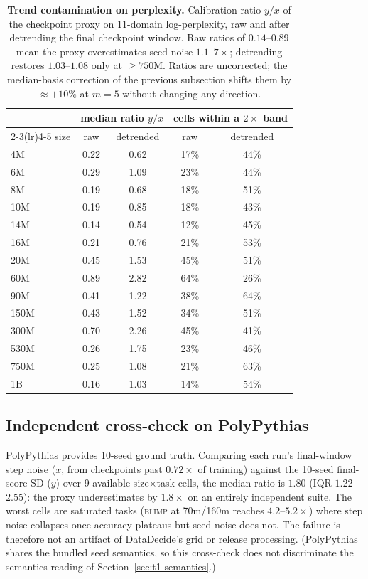 \begin{table}[!htbp]
\centering
\caption{\textbf{Trend contamination on perplexity.} Calibration ratio $y/x$ of the checkpoint
proxy on 11-domain log-perplexity, raw and after detrending the final checkpoint window. Raw
ratios of $0.14$--$0.89$ mean the proxy overestimates seed noise $1.1$--$7\times$; detrending
restores $1.03$--$1.08$ only at ${\ge}750$M. Ratios are uncorrected; the median-basis
correction of the previous subsection shifts them by ${\approx}+10\%$ at $m = 5$ without
changing any direction.}
\label{tab:t1c}
\footnotesize
\begin{tabular}{@{}lcccc@{}}
\toprule
& \multicolumn{2}{c}{median ratio $y/x$} & \multicolumn{2}{c}{cells within a $2\times$ band} \\
\cmidrule(lr){2-3}\cmidrule(lr){4-5}
size & raw & detrended & raw & detrended \\
\midrule
4M & 0.22 & 0.62 & 17\% & 44\% \\
6M & 0.29 & 1.09 & 23\% & 44\% \\
8M & 0.19 & 0.68 & 18\% & 51\% \\
10M & 0.19 & 0.85 & 18\% & 43\% \\
14M & 0.14 & 0.54 & 12\% & 45\% \\
16M & 0.21 & 0.76 & 21\% & 53\% \\
20M & 0.45 & 1.53 & 45\% & 51\% \\
60M & 0.89 & 2.82 & 64\% & 26\% \\
90M & 0.41 & 1.22 & 38\% & 64\% \\
150M & 0.43 & 1.52 & 34\% & 51\% \\
300M & 0.70 & 2.26 & 45\% & 41\% \\
530M & 0.26 & 1.75 & 23\% & 46\% \\
750M & 0.25 & 1.08 & 21\% & 63\% \\
1B & 0.16 & 1.03 & 14\% & 54\% \\
\bottomrule
\end{tabular}
\end{table}

\subsection{Independent cross-check on PolyPythias}
\label{app:t1-pp}

PolyPythias provides 10-seed ground truth. Comparing each run's final-window step noise ($x$,
from checkpoints past $0.72\times$ of training) against the 10-seed final-score SD ($y$) over 9
available size$\times$task cells, the median ratio is $1.80$ (IQR $1.22$--$2.55$): the proxy
underestimates by $1.8\times$ on an entirely independent suite. The worst cells are saturated
tasks (\textsc{blimp} at 70m/160m reaches $4.2$--$5.2\times$) where step noise collapses once
accuracy plateaus but seed noise does not. The failure is therefore not an artifact of
DataDecide's grid or release processing. (PolyPythias shares the bundled seed semantics,
so this cross-check does not discriminate the semantics reading of Section~\ref{sec:t1-semantics}.)
